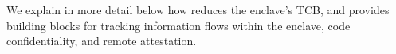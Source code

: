 We explain in more detail below how \systemname{} reduces the enclave's TCB,
and provides building blocks for tracking information flows within the enclave, code confidentiality, and remote attestation.












